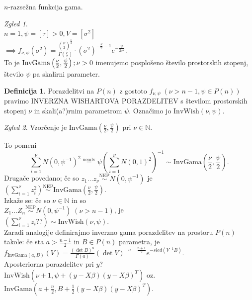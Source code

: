 \documentclass[a4paper, 12pt]{book}
\theoremstyle{definition}
\newtheorem{defn}[counter]{Definicija}
\theoremstyle{remark}
\newtheorem*{exmp}{Zgled}
\newcommand{\N}{\mathbb{N}}
\begin{document}
$n$-razsežna funkcija gama.
\begin{exmp} \text{} \\
  $n=1, \psi = [\tau] > 0, V = \left[\sigma^2\right]$ \\
  $\implies f_{\nu, \psi}(\sigma^2) =
  \frac{\left(\frac{\psi}{2}\right)^{\frac{\nu}{2}}}{\Gamma\left(\frac{\nu}{2}\right)} \cdot
  \left(\sigma^2\right)^{-\frac{\nu}{2} - 1} e^{-\frac{\psi}{2 \sigma^2}}$. \\
  To je $\text{InvGama}\left(\frac{\nu}{2}, \frac{\psi}{2}\right); \\
  \nu > 0$ imenujemo posplošeno število prostorskih stopenj,
  število $\psi$ pa  skalirni parameter.
\end{exmp}
\begin{defn}
  Porazdelitvi na $P(n)$ z gostoto $f_{\nu, \psi} \; (\nu > n-1, \psi \in P(n))$ pravimo
  INVERZNA WISHARTOVA PORAZDELITEV s številom prostorskih stopenj $\nu$
  in skali(a?)rnim parametrom $\psi$.
  Označimo jo $\text{InvWish}(\nu, \psi)$.
\end{defn}
\begin{exmp}
  Vzorčenje je $\text{InvGama}\left(\frac{\nu}{2}, \frac{\psi}{2}\right)$ pri $\nu \in \N$.
\end{exmp}
To pomeni
\begin{equation*}
  \sum_{i=1}^{\nu} N(0, \psi^{-1})^2 \stackrel{\text{neodv}}{=}
  \psi\left(\sum_{i=1}^{\nu} N(0, 1)^2\right)^{-1} \sim
  \text{InvGama}\left(\frac{\nu}{2}, \frac{\psi}{2}\right).
\end{equation*}
Drugače povedano; če so $z_1 \dots z_{\nu} \stackrel{\text{NEP}}{\sim} N(0, \psi^{-1})$ je \\
$\left(\sum_{i=1}^{\nu} z_i^2\right) \stackrel{\text{NEP}}{\sim}
\text{InvGama}\left(\frac{\nu}{2}, \frac{\psi}{2}\right)$. \\
Izkaže se: če so $\nu \in \N$ in so \\
$Z_1 \dots Z_n \stackrel{\text{NEP}}{\sim} N(0, \psi^{-1}) \; (\nu > n-1)$, je \\
$\left(\sum_{i=1}^{\nu} z_i ??\right) \sim \text{InvWish}(\nu, \psi)$. \\
Zaradi analogije definirajmo inverzno gama porazdelitev na prostoru $P(n)$ takole:
če sta $a > \frac{n-1}{2}$ in $B \in P(n)$ parametra, je \\
$f_{\text{InvGama}(a, B)}(V) = \frac{(\det B)^{a}}{\Gamma(a)} (\det V)^{-a - \frac{n+1}{2}}
e^{-sled \left(V^{-1} B\right)}$. \\
Aposteriorna porazdelitev pri $y$? \\
$\text{InvWish}(\nu+1, \psi + (y - X \beta) (y - X \beta)^T)$ oz. \\
$\text{InvGama}\left(a + \frac{n}{2}, B + \frac{1}{2} (y - X \beta) (y - X \beta)^T\right)$.
\end{document}
